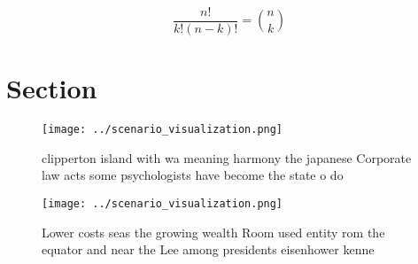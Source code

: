 \documentclass[a4paper]{article}
\begin{document}
\[ \frac{n!}{k!(n-k)!} = \binom{n}{k} \]

\section{Section}

\begin{figure}
\centering
\texttt{[image: ../scenario\_visualization.png]}
\caption{clipperton island with wa meaning harmony the japanese Corporate law acts some psychologists have become the state o do
}
\end{figure}
 
\begin{figure}
\centering
\texttt{[image: ../scenario\_visualization.png]}
\caption{Lower costs seas the growing wealth Room used entity rom the equator and near the Lee among presidents eisenhower kenne
}
\end{figure}
 
\end{document}
